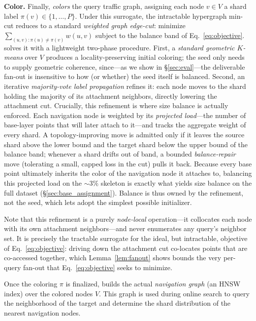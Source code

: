 \noindent\textbf{Color.} Finally, \sysname \emph{colors} the query traffic graph, assigning each node $v\in V$ a shard label $\pi(v)\in\{1,\dots,P\}$. Under this surrogate, the intractable hypergraph min-cut reduces to a standard \emph{weighted graph edge-cut}: minimize $\sum_{(u,v):\pi(u)\neq\pi(v)} w(u,v)$ subject to the balance band of Eq.~\eqref{eq:objective}. \sysname solves it with a lightweight two-phase procedure. First, a \emph{standard geometric $K$-means} over $V$ produces a locality-preserving initial coloring; the seed only needs to supply geometric coherence, since---as we show in \S\ref{sec:eval}---the deliverable fan-out is insensitive to how (or whether) the seed itself is balanced. Second, an iterative \emph{majority-vote label propagation} refines it: each node moves to the shard holding the majority of its attachment neighbors, directly lowering the attachment cut. Crucially, this refinement is where size balance is actually enforced. Each navigation node is weighted by its \emph{projected load}---the number of base-layer points that will later attach to it---and \sysname tracks the aggregate weight of every shard. A topology-improving move is admitted only if it leaves the source shard above the lower bound and the target shard below the upper bound of the balance band; whenever a shard drifts out of band, a bounded \emph{balance-repair} move (tolerating a small, capped loss in the cut) pulls it back. Because every base point ultimately inherits the color of the navigation node it attaches to, balancing this projected load on the $\sim\!3\%$ skeleton is exactly what yields size balance on the full dataset (\S\ref{sec:base_assignment}). Balance is thus owned by the refinement, not the seed, which lets \sysname adopt the simplest possible initializer.

Note that this refinement is a purely \emph{node-local} operation---it collocates each node with its own attachment neighbors---and never enumerates any query's neighbor set. It is precisely the tractable surrogate for the ideal, but intractable, objective of Eq.~\eqref{eq:objective}: driving down the attachment cut co-locates points that are co-accessed together, which Lemma~\ref{lem:fanout} shows bounds the very per-query fan-out that Eq.~\eqref{eq:objective} seeks to minimize.

Once the coloring $\pi$ is finalized, \sysname builds the actual \emph{navigation graph} (an HNSW index) over the colored nodes $V$. This graph is used during online search to query the neighborhood of the target and determine the shard distribution of the nearest navigation nodes.


